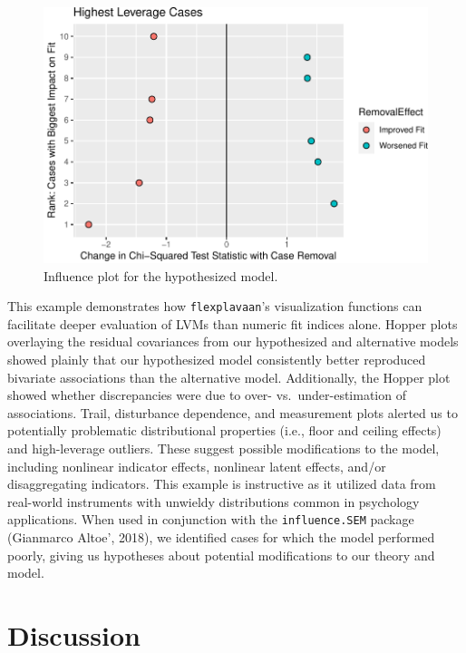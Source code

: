 \documentclass[
  english,
  man]{apa6}
\begin{document}
\begin{figure}

{\centering \includegraphics[width=0.6\linewidth]{flexplavaan_draft_files/figure-latex/influence-1} 

}

\caption{Influence plot for the hypothesized model.}\label{fig:influence}
\end{figure}

This example demonstrates how \texttt{flexplavaan}'s visualization functions can facilitate deeper evaluation of LVMs than numeric fit indices alone. Hopper plots overlaying the residual covariances from our hypothesized and alternative models showed plainly that our hypothesized model consistently better reproduced bivariate associations than the alternative model. Additionally, the Hopper plot showed whether discrepancies were due to over- vs.~under-estimation of associations. Trail, disturbance dependence, and measurement plots alerted us to potentially problematic distributional properties (i.e., floor and ceiling effects) and high-leverage outliers. These suggest possible modifications to the model, including nonlinear indicator effects, nonlinear latent effects, and/or disaggregating indicators. This example is instructive as it utilized data from real-world instruments with unwieldy distributions common in psychology applications. When used in conjunction with the \texttt{influence.SEM} package (Gianmarco Altoe', 2018), we identified cases for which the model performed poorly, giving us hypotheses about potential modifications to our theory and model.

\hypertarget{discussion}{%
\section{Discussion}\label{discussion}}
\end{document}
